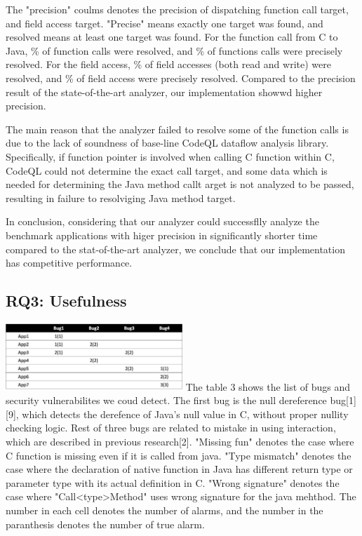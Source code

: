 The "precision" coulms denotes the precision of dispatching function call
target, and field access target.  "Precise" means exactly one target was found,
and resolved means at least one target was found. For the function call from C to Java,
\% of function calls were resolved, and \% of functions calls
were precisely resolved. For the field access, \% of field accesses (both
read and write) were resolved, and \% of field access were precisely resolved.
Compared to the precision result of the state-of-the-art analyzer, our implementation
showwd higher precision.

The main reason that the analyzer failed to resolve some of the function calls
is due to the lack of soundness of base-line CodeQL dataflow analysis library.
Specifically, if function pointer is involved when calling C function within C,
CodeQL could not determine the exact call target, and some data which is needed
for determining the Java method callt arget is not analyzed to be passed, resulting
in failure to resolviging Java method target.

In conclusion, considering that our analyzer could successflly analyze the
benchmark applications with higer precision in significantly shorter time
compared to the stat-of-the-art analyzer, we conclude that our implementation
has competitive performance.

\subsection{RQ3: Usefulness}
\includegraphics[width=0.5\textwidth]{img/table3}
The table 3 shows the list of bugs and security vulnerabilites we coud detect.
The first bug is the null dereference bug[1][9], which detects the derefence of
Java's null value in C, without proper nullity checking logic. Rest of three
bugs are related to mistake in using interaction, which are described in
previous research[2]. "Missing fun" denotes the case where C function is
missing even if it is called from java. "Type mismatch" denotes the case where
the declaration of native function in Java has different return type or
parameter type with its actual definition in C.  "Wrong signature" denotes the
case where "Call<type>Method" uses wrong signature for the java mehthod. The
number in each cell denotes the number of alarms, and the number in the
paranthesis denotes the number of true alarm.


